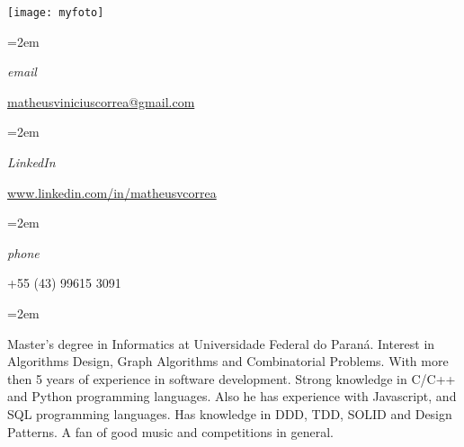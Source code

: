 \documentclass[fontsize=14pt,paper=a4]{scrartcl}
\date{} %
\newcommand{\ProfileInfo}[2]{\noindent\hangindent=2em\hangafter=0
  \parbox{5em}{\small \textit{#1}\hspace{1em}} {\small #2}}
\newcommand{\Description}[1]{\hangindent=2em\hangafter=0\noindent\raggedright\footnotesize{#1}\par\flushleft\normalsize}
\begin{document}
\pagestyle{scrheadings}


\begin{cv}{%
    \noindent%
    \begin{minipage}{.68\textwidth}%
    \end{minipage}%
    \hfill%
    \begin{minipage}{.30\textwidth}%
      \begin{flushright}%
        \texttt{[image: myfoto]}
      \end{flushright}%
    \end{minipage}%
  }\vspace{-.7em}
  

  \vspace{.5em}

  \ProfileInfo{email}{\href{mailto:matheusviniciuscorrea@gmail.com}{matheusviniciuscorrea@gmail.com}}

  \ProfileInfo{LinkedIn}{\href{https://www.linkeding.com/in/matheusvcorrea}{www.linkedin.com/in/matheusvcorrea}}

  \ProfileInfo{phone}{+55 (43) 99615 3091}
  
  \vspace{1em}

  \noindent{}\vspace{1em}
  
  \Description{%
    Master's degree in Informatics at Universidade Federal do Paraná. Interest
    in Algorithms Design, Graph Algorithms and Combinatorial Problems. With more
    then 5 years of experience in software development. Strong knowledge in
    C/C++ and Python programming languages. Also he has experience with
    Javascript, and SQL programming languages. Has knowledge in DDD, TDD, SOLID
    and Design Patterns. A fan of good music and competitions in general.%
  }


\end{cv}
\end{document}
